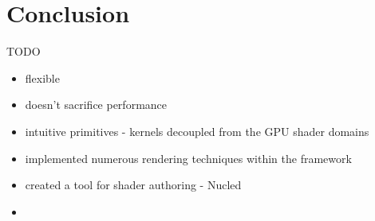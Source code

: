 
\chapter{ Conclusion }
\label{Chapter7}

TODO

\begin{itemize}
\item flexible
\item doesn't sacrifice performance
\item intuitive primitives - kernels decoupled from the GPU shader domains

\item implemented numerous rendering techniques within the framework
\item created a tool for shader authoring - Nucled
\item 
\end{itemize}
